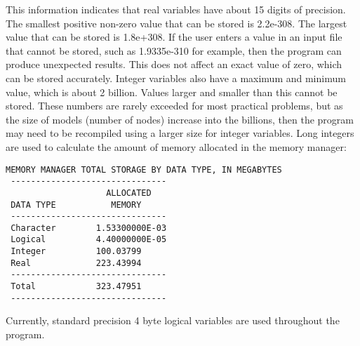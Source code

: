 This information indicates that real variables have about 15 digits of precision.  The smallest positive non-zero value that can be stored is 2.2e-308.  The largest value that can be stored is 1.8e+308.  If the user enters a value in an input file that cannot be stored, such as 1.9335e-310 for example, then the program can produce unexpected results.  This does not affect an exact value of zero, which can be stored accurately.  Integer variables also have a maximum and minimum value, which is about 2 billion.  Values larger and smaller than this cannot be stored.  These numbers are rarely exceeded for most practical problems, but as the size of models (number of nodes) increase into the billions, then the program may need to be recompiled using a larger size for integer variables. Long integers are used to calculate the amount of memory allocated in the memory manager:

{\small
\begin{lstlisting}[style=modeloutput]
 MEMORY MANAGER TOTAL STORAGE BY DATA TYPE, IN MEGABYTES
 -------------------------------
                    ALLOCATED   
 DATA TYPE           MEMORY     
 -------------------------------
 Character        1.53300000E-03
 Logical          4.40000000E-05
 Integer          100.03799     
 Real             223.43994     
 -------------------------------
 Total            323.47951     
 -------------------------------
\end{lstlisting}
}

Currently, standard precision 4 byte logical variables are used throughout the program.
